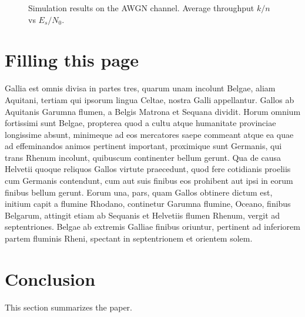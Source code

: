 \documentclass[journal, a4paper]{IEEEtran}
\begin{document}
	
	\begin{figure}[!hbt]
		\begin{center}
			\caption{Simulation results on the AWGN channel. Average throughput $k/n$ vs $E_s/N_0$.}
			\label{fig:tf_plot}
		\end{center}
	\end{figure}
	
	\section{Filling this page}
	Gallia est omnis divisa in partes tres, quarum unam incolunt Belgae, aliam Aquitani, tertiam qui ipsorum lingua Celtae, nostra Galli appellantur. Gallos ab Aquitanis Garumna flumen, a Belgis Matrona et Sequana dividit. Horum omnium fortissimi sunt Belgae, propterea quod a cultu atque humanitate provinciae longissime absunt, minimeque ad eos mercatores saepe commeant atque ea quae ad effeminandos animos pertinent important, proximique sunt Germanis, qui trans Rhenum incolunt, quibuscum continenter bellum gerunt. Qua de causa Helvetii quoque reliquos Gallos virtute praecedunt, quod fere cotidianis proeliis cum Germanis contendunt, cum aut suis finibus eos prohibent aut ipsi in eorum finibus bellum gerunt. Eorum una, pars, quam Gallos obtinere dictum est, initium capit a flumine Rhodano, continetur Garumna flumine, Oceano, finibus Belgarum, attingit etiam ab Sequanis et Helvetiis flumen Rhenum, vergit ad septentriones. Belgae ab extremis Galliae finibus oriuntur, pertinent ad inferiorem partem fluminis Rheni, spectant in septentrionem et orientem solem.
	
	\section{Conclusion}
	This section summarizes the paper.
	
\end{document}
